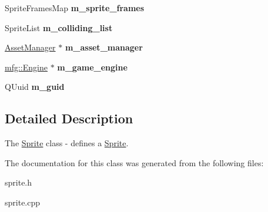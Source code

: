 \begin{DoxyCompactItemize}
Sprite\+Frames\+Map {\bfseries m\+\_\+sprite\+\_\+frames}
\item 
\mbox{\label{class_sprite_a4e0c8c16649b6f95e87c1af002f4375a}} 
Sprite\+List {\bfseries m\+\_\+colliding\+\_\+list}
\item 
\mbox{\label{class_sprite_af29e1d71cf77027699b3976598d6732c}} 
\hyperlink{class_asset_manager}{Asset\+Manager} $\ast$ {\bfseries m\+\_\+asset\+\_\+manager}
\item 
\mbox{\label{class_sprite_adad80bf689553b255a77881a8a0d21a7}} 
\hyperlink{classmfg_1_1_engine}{mfg\+::\+Engine} $\ast$ {\bfseries m\+\_\+game\+\_\+engine}
\item 
\mbox{\label{class_sprite_ad19296749b5cd1f97e28163386d08f1e}} 
Q\+Uuid {\bfseries m\+\_\+guid}
\end{DoxyCompactItemize}


\subsection{Detailed Description}
The \hyperlink{class_sprite}{Sprite} class -\/ defines a \hyperlink{class_sprite}{Sprite}. 

The documentation for this class was generated from the following files\+:\begin{DoxyCompactItemize}
\item 
sprite.\+h\item 
sprite.\+cpp\end{DoxyCompactItemize}
